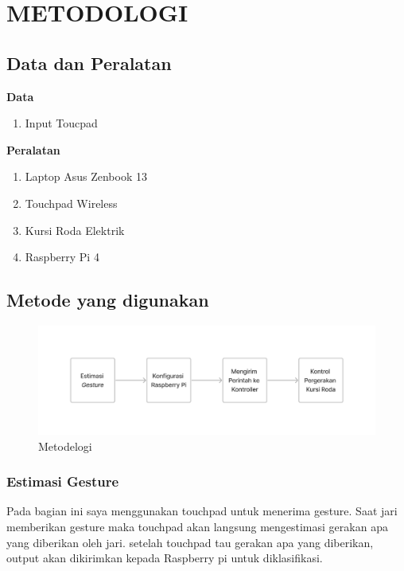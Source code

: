 \chapter{METODOLOGI}


\section{Data dan Peralatan}

\textbf{Data}
\begin{enumerate}
    \item Input Toucpad
\end{enumerate}

\textbf{Peralatan}
\begin{enumerate}
    \item Laptop Asus Zenbook 13
    \item Touchpad Wireless 
    \item Kursi Roda Elektrik
    \item Raspberry Pi 4
\end{enumerate}

\section{Metode yang digunakan}
\begin{figure} [H] \centering
  \includegraphics[scale=0.3]{gambar/metodologi.jpg}
  \caption{Metodelogi}
  \label{fig:metodelogi}
\end{figure}

\subsection{Estimasi Gesture}
Pada bagian ini saya menggunakan touchpad untuk menerima gesture. Saat jari memberikan gesture maka touchpad akan langsung mengestimasi gerakan apa yang diberikan oleh jari. setelah touchpad tau gerakan apa yang diberikan, output akan dikirimkan kepada Raspberry pi untuk diklasifikasi.


